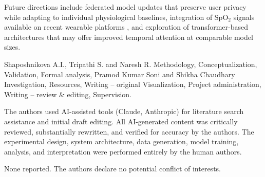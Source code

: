 \documentclass[HARVARD,Times2COL]{WileyNJDv5} %
\providecommand{\DIFadd}[1]{{\protect\color{red} #1}} %
\providecommand{\DIFdel}[1]{} %
\providecommand{\DIFaddbegin}{} %
\providecommand{\DIFaddend}{} %
\providecommand{\DIFdelbegin}{} %
\providecommand{\DIFdelend}{} %
\providecommand{\DIFscaledelfig}{0.5}
\newlength{\DIFdelgraphicswidth} %
\newlength{\DIFdelgraphicsheight} %
\providecommand{\DIFaddincludegraphics}[2][]{{\color{blue}\fbox{\DIFOincludegraphics[#1]{#2}}}} %
\providecommand{\DIFdelincludegraphics}[2][]{%
\sbox{\DIFdelgraphicsbox}{\DIFOincludegraphics[#1]{#2}}%
\settoboxwidth{\DIFdelgraphicswidth}{\DIFdelgraphicsbox} %
\settoboxtotalheight{\DIFdelgraphicsheight}{\DIFdelgraphicsbox} %
\scalebox{\DIFscaledelfig}{%
\parbox[b]{\DIFdelgraphicswidth}{\usebox{\DIFdelgraphicsbox}\\[-\baselineskip] \rule{\DIFdelgraphicswidth}{0em}}\llap{\resizebox{\DIFdelgraphicswidth}{\DIFdelgraphicsheight}{%
\setlength{\unitlength}{\DIFdelgraphicswidth}%
\begin{picture}(1,1)%
\thicklines\linethickness{2pt} %
{\color[rgb]{1,0,0}\put(0,0){\framebox(1,1){}}}%
{\color[rgb]{1,0,0}\put(0,0){\line( 1,1){1}}}%
{\color[rgb]{1,0,0}\put(0,1){\line(1,-1){1}}}%
\end{picture}%
}\hspace*{3pt}}} %
} %
\DeclareRobustCommand{\DIFaddbegin}{\DIFOaddbegin \let\includegraphics\DIFaddincludegraphics} %
\DeclareRobustCommand{\DIFaddend}{\DIFOaddend \let\includegraphics\DIFOincludegraphics} %
\DeclareRobustCommand{\DIFdelbegin}{\DIFOdelbegin \let\includegraphics\DIFdelincludegraphics} %
\DeclareRobustCommand{\DIFdelend}{\DIFOaddend \let\includegraphics\DIFOincludegraphics} %
\begin{document}
\DIFaddend Future directions include federated model updates \DIFdelbegin \DIFdel{preserving user privacy and }\DIFdelend \DIFaddbegin \DIFadd{that preserve user privacy while adapting to individual physiological baselines, }\DIFaddend integration of SpO$_2$ signals available on recent wearable platforms\DIFaddbegin \DIFadd{, and exploration of transformer-based architectures that may offer improved temporal attention at comparable model sizes}\DIFaddend .



{}
Shaposhnikova A.I., Tripathi S. and Naresh R. Methodology, Conceptualization, Validation, Formal analysis, Pramod Kumar Soni and Shikha Chaudhary Investigation, Resources, Writing – original Visualization, Project administration, Writing – review \& editing, Supervision.

\DIFdelbegin %
\DIFdelend \DIFaddbegin \DIFadd{The authors used AI-assisted tools (Claude, Anthropic) for literature search assistance and initial draft editing. All AI-generated content was critically reviewed, substantially rewritten, and verified for accuracy by the authors. The experimental design, system architecture, data generation, model training, analysis, and interpretation were performed entirely by the human authors.
}\DIFaddend 

None reported.
The authors declare no potential conflict of interests.

\end{document}
